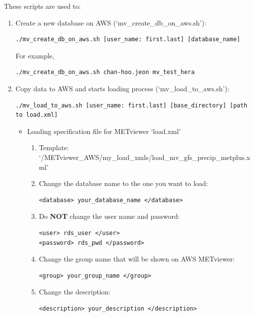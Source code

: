 \documentclass[11pt,fleqn]{report}              %
\begin{document}
These scripts are used to:
\begin{enumerate}
\item Create a new database on AWS (`mv\_create\_db\_on\_aws.sh'):
\lstset{language=bash}   
\begin{lstlisting}[frame=trBL]
./mv_create_db_on_aws.sh [user_name: first.last] [database_name]
\end{lstlisting}

For example,
\lstset{language=bash}   
\begin{lstlisting}[frame=trBL]
./mv_create_db_on_aws.sh chan-hoo.jeon mv_test_hera
\end{lstlisting}


\item Copy data to AWS and starts loading process (`mv\_load\_to\_aws.sh'):
\lstset{language=bash}   
\begin{lstlisting}[frame=trBL]
./mv_load_to_aws.sh [user_name: first.last] [base_directory] [path to load.xml]
\end{lstlisting}

\begin{itemize}
\item Loading specification file for METviewer `load.xml'
\begin{enumerate}
\item Template: `/METviewer\_AWS/my\_load\_xmls/load\_mv\_gfs\_precip\_metplus.xml'
\item Change the database name to the one you want to load:
\lstset{language=XML}   
\begin{lstlisting}[frame=trBL]
<database> your_database_name </database>
\end{lstlisting}

\item Do {\bf NOT} change the user name and password:
\lstset{language=XML}   
\begin{lstlisting}[frame=trBL]
<user> rds_user </user>
<password> rds_pwd </password>
\end{lstlisting}

\item Change the group name that will be shown on AWS METviewer:
\lstset{language=XML}   
\begin{lstlisting}[frame=trBL]
<group> your_group_name </group>
\end{lstlisting}

\item Change the description:
\lstset{language=XML}   
\begin{lstlisting}[frame=trBL]
<description> your_description </description>
\end{lstlisting}


\end{enumerate}
\end{itemize}
\end{enumerate}
\end{document}
